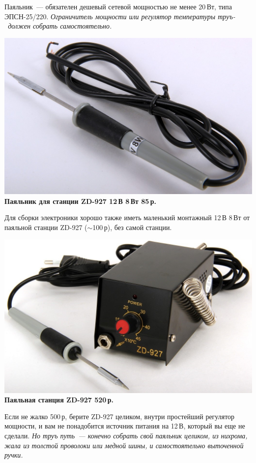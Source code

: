 \documentclass{magazine}
\begin{document}
\begin{multicols}{2}
Паяльник\ --- обязателен дешевый сетевой мощностью не менее 20\,Вт, типа
ЭПСН-25/220.
\emph{Ограничитель мощности или регулятор температуры труъ-\scr\ должен собрать
самостоятельно.}

\noindent\href{http://voltmaster-samara.ru/catalog/product/00047380/}{
\includegraphics[width=\columnwidth]{fig/00/Iron8W.jpg}}
\textbf{Паяльник для станции ZD-927 12\,В 8\,Вт 85\,р.}

Для сборки электроники хорошо также иметь маленький монтажный 12\,В 8\,Вт от
паяльной станции ZD-927 ($\sim$100\,р), без самой станции. 

\noindent\href{http://voltmaster-samara.ru/catalog/product/00073790/}{
\includegraphics[width=\columnwidth]{fig/00/ZD927.jpg}}
\textbf{Паяльная станция ZD-927 520\,р.}

Если не жалко 500\,р, берите ZD-927 целиком, внутри простейший регулятор
мощности, и вам не понадобится источник питания на 12\,В, который вы еще не
сделали. \emph{Но труъ путь\ --- конечно собрать свой паяльник целиком, из
нихрома, жала из толстой проволоки или медной шины, и самостоятельно выточенной
ручки.}


\end{multicols}
\end{document}

